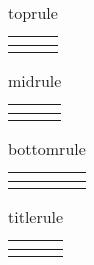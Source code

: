 \begin{table}[!tbp]
\caption{toprule\label{toprule}} 
\begin{center}
\begin{tabular}{l}
\hline\hline
\multicolumn{1}{c}{}\tabularnewline
\hline
\toprule\tabularnewline
\hline
\end{tabular}\end{center}
\end{table}
\begin{table}[!tbp]
\caption{midrule\label{midrule}} 
\begin{center}
\begin{tabular}{l}
\hline\hline
\multicolumn{1}{c}{}\tabularnewline
\hline
\midrule\tabularnewline
\hline
\end{tabular}\end{center}
\end{table}
\begin{table}[!tbp]
\caption{bottomrule\label{bottomrule}} 
\begin{center}
\begin{tabular}{l}
\hline\hline
\multicolumn{1}{c}{}\tabularnewline
\hline
\bottomrule\tabularnewline
\hline
\end{tabular}\end{center}
\end{table}
\begin{table}[!tbp]
\caption{titlerule\label{titlerule}} 
\begin{center}
\begin{tabular}{l}
\hline\hline
\multicolumn{1}{c}{}\tabularnewline
\hline
\cmidrule(lr)\tabularnewline
\hline
\end{tabular}\end{center}
\end{table}
